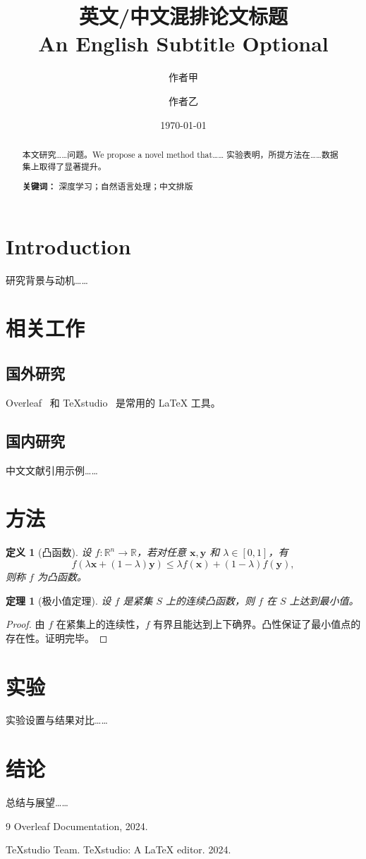 \documentclass[UTF8,a4paper,12pt]{ctexart}
\title{英文/中文混排论文标题\\{\normalsize An English Subtitle Optional}}
\author{作者甲 \and 作者乙}
\date{\today}
\newtheorem{theorem}{定理}[section]
\newtheorem{definition}{定义}[section]
\begin{document}
\maketitle

\begin{abstract}
本文研究……问题。We propose a novel method that…… 实验表明，所提方法在……数据集上取得了显著提升。

\textbf{关键词：} 深度学习；自然语言处理；中文排版
\end{abstract}

\section{Introduction}

研究背景与动机……

\section{相关工作}

\subsection{国外研究}

Overleaf~\cite{overleaf2024} 和 TeXstudio~\cite{texstudio} 是常用的 LaTeX 工具。

\subsection{国内研究}

中文文献引用示例……

\section{方法}

\begin{definition}[凸函数]
  设 $f: \mathbb{R}^n \to \mathbb{R}$，若对任意 $\mathbf{x}, \mathbf{y}$ 和 $\lambda \in [0,1]$，有
  \[
    f(\lambda \mathbf{x} + (1-\lambda)\mathbf{y})
    \leq \lambda f(\mathbf{x}) + (1-\lambda) f(\mathbf{y}),
  \]
  则称 $f$ 为凸函数。
\end{definition}

\begin{theorem}[极小值定理]
  设 $f$ 是紧集 $S$ 上的连续凸函数，则 $f$ 在 $S$ 上达到最小值。
\end{theorem}

\begin{proof}
  由 $f$ 在紧集上的连续性，$f$ 有界且能达到上下确界。凸性保证了最小值点的存在性。证明完毕。
\end{proof}

\section{实验}

实验设置与结果对比……

\section{结论}

总结与展望……

\begin{thebibliography}{9}
Overleaf Documentation, 2024.

TeXstudio Team. TeXstudio: A LaTeX editor. 2024.
\end{thebibliography}
\end{document}
